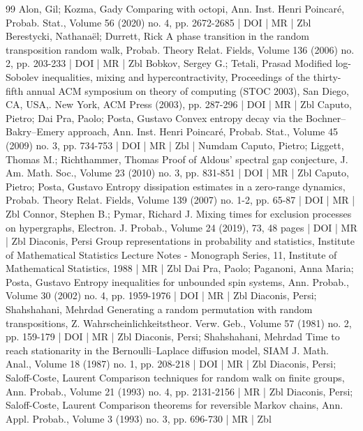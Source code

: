 \documentclass[10pt]{amsart}
\theoremstyle{definition}\newtheorem{defi}[theo]{Definition}\newtheorem{rema}[theo]{Remark}\newtheorem{exam}[theo]{Example}\newtheorem{exem}[theo]{Example}\newtheorem{nota}[theo]{Notation}
\begin{document}
\begin{thebibliography}{99}
Alon, Gil; Kozma, Gady Comparing with octopi, Ann. Inst. Henri Poincaré, Probab. Stat., Volume 56 (2020) no. 4, pp. 2672-2685 | DOI | MR | Zbl
Berestycki, Nathanaël; Durrett, Rick A phase transition in the random transposition random walk, Probab. Theory Relat. Fields, Volume 136 (2006) no. 2, pp. 203-233 | DOI | MR | Zbl
Bobkov, Sergey G.; Tetali, Prasad Modified log-Sobolev inequalities, mixing and hypercontractivity, Proceedings of the thirty-fifth annual ACM symposium on theory of computing (STOC 2003), San Diego, CA, USA,. New York, ACM Press (2003), pp. 287-296 | DOI | MR | Zbl
Caputo, Pietro; Dai Pra, Paolo; Posta, Gustavo Convex entropy decay via the Bochner–Bakry–Emery approach, Ann. Inst. Henri Poincaré, Probab. Stat., Volume 45 (2009) no. 3, pp. 734-753 | DOI | MR | Zbl | Numdam
Caputo, Pietro; Liggett, Thomas M.; Richthammer, Thomas Proof of Aldous’ spectral gap conjecture, J. Am. Math. Soc., Volume 23 (2010) no. 3, pp. 831-851 | DOI | MR | Zbl
Caputo, Pietro; Posta, Gustavo Entropy dissipation estimates in a zero-range dynamics, Probab. Theory Relat. Fields, Volume 139 (2007) no. 1-2, pp. 65-87 | DOI | MR | Zbl
Connor, Stephen B.; Pymar, Richard J. Mixing times for exclusion processes on hypergraphs, Electron. J. Probab., Volume 24 (2019), 73, 48 pages | DOI | MR | Zbl
Diaconis, Persi Group representations in probability and statistics, Institute of Mathematical Statistics Lecture Notes - Monograph Series, 11, Institute of Mathematical Statistics, 1988 | MR | Zbl
Dai Pra, Paolo; Paganoni, Anna Maria; Posta, Gustavo Entropy inequalities for unbounded spin systems, Ann. Probab., Volume 30 (2002) no. 4, pp. 1959-1976 | DOI | MR | Zbl
Diaconis, Persi; Shahshahani, Mehrdad Generating a random permutation with random transpositions, Z. Wahrscheinlichkeitstheor. Verw. Geb., Volume 57 (1981) no. 2, pp. 159-179 | DOI | MR | Zbl
Diaconis, Persi; Shahshahani, Mehrdad Time to reach stationarity in the Bernoulli–Laplace diffusion model, SIAM J. Math. Anal., Volume 18 (1987) no. 1, pp. 208-218 | DOI | MR | Zbl
Diaconis, Persi; Saloff-Coste, Laurent Comparison techniques for random walk on finite groups, Ann. Probab., Volume 21 (1993) no. 4, pp. 2131-2156 | MR | Zbl
Diaconis, Persi; Saloff-Coste, Laurent Comparison theorems for reversible Markov chains, Ann. Appl. Probab., Volume 3 (1993) no. 3, pp. 696-730 | MR | Zbl

\end{thebibliography}
\end{document}
